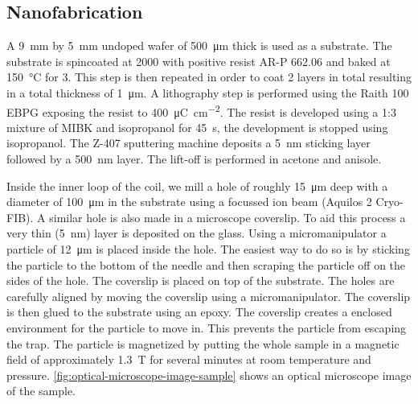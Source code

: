 \subsection{Nanofabrication}
\label{subsec:nanofabrication}
A \qty{9}{\mm} by \qty{5}{\mm} undoped  wafer of \qty{500}{\um} thick is used as a substrate. The substrate is spincoated at \qty{2000}{\rpm} with positive resist AR-P 662.06 and baked at \qty{150}{\celsius} for \qty{3}{\min}. This step is then repeated in order to coat 2 layers in total resulting in a total thickness of \qty{1}{\um}. A lithography step is performed using the Raith 100 EBPG exposing the resist to \qty{400}{\micro\coulomb\per\square\cm}. The resist is developed using a 1:3 mixture of MIBK and isopropanol for \qty{45}{\s}, the development is stopped using isopropanol. The Z-407 sputtering machine deposits a \qty{5}{\nm}  sticking layer followed by a \qty{500}{\nm}  layer. The lift-off is performed in acetone and anisole.

Inside the inner loop of the coil, we mill a hole of roughly \qty{15}{\um} deep with a diameter of \qty{100}{\um} in the  substrate using a  focussed ion beam (Aquilos 2 Cryo-FIB). A similar hole is also made in a microscope coverslip. To aid this process a very thin (\qty{5}{\nano\meter})  layer is deposited on the glass. Using a micromanipulator a  particle of \qty{12}{\um} is placed inside the  hole. The easiest way to do so is by sticking the particle to the bottom of the needle and then scraping the particle off on the sides of the  hole. The coverslip is placed on top of the  substrate. The holes are carefully aligned by moving the coverslip using a micromanipulator. The coverslip is then glued to the  substrate using an epoxy. The coverslip creates a enclosed environment for the particle to move in. This prevents the particle from escaping the trap. The particle is magnetized by putting the whole sample in a magnetic field of approximately \qty{1.3}{\tesla} for several minutes at room temperature and pressure. \autoref{fig:optical-microscope-image-sample} shows an optical microscope image of the sample.

